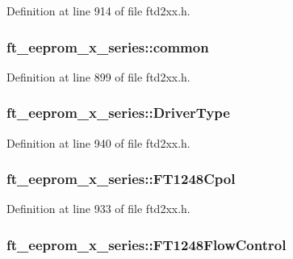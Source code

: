 Definition at line 914 of file ftd2xx.h.\hypertarget{structft__eeprom__x__series_a4d1ac63e7dc2e8e677edcc43b566dc01}{
\subsubsection[{common}]{ {\bf ft\_\-eeprom\_\-x\_\-series::common}}}
\label{structft__eeprom__x__series_a4d1ac63e7dc2e8e677edcc43b566dc01}


Definition at line 899 of file ftd2xx.h.\hypertarget{structft__eeprom__x__series_a9379ff3b9473a839ebd27a753c3c1b60}{
\subsubsection[{DriverType}]{ {\bf ft\_\-eeprom\_\-x\_\-series::DriverType}}}
\label{structft__eeprom__x__series_a9379ff3b9473a839ebd27a753c3c1b60}


Definition at line 940 of file ftd2xx.h.\hypertarget{structft__eeprom__x__series_aad1d7a7df7f73970d4fcb1d59a22c259}{
\subsubsection[{FT1248Cpol}]{ {\bf ft\_\-eeprom\_\-x\_\-series::FT1248Cpol}}}
\label{structft__eeprom__x__series_aad1d7a7df7f73970d4fcb1d59a22c259}


Definition at line 933 of file ftd2xx.h.\hypertarget{structft__eeprom__x__series_a41a97bfe47b52d3143f6e6a3c833da03}{
\subsubsection[{FT1248FlowControl}]{ {\bf ft\_\-eeprom\_\-x\_\-series::FT1248FlowControl}}}
\label{structft__eeprom__x__series_a41a97bfe47b52d3143f6e6a3c833da03}


